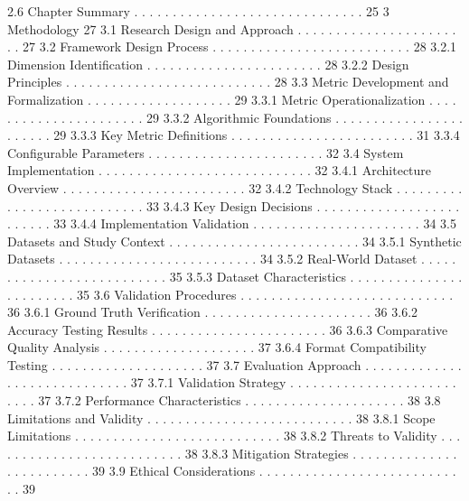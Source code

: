 2.6 Chapter Summary . . . . . . . . . . . . . . . . . . . . . . . . . . . . . . 25
3 Methodology 27
3.1 Research Design and Approach . . . . . . . . . . . . . . . . . . . . . . . 27
3.2 Framework Design Process . . . . . . . . . . . . . . . . . . . . . . . . . . 28
3.2.1 Dimension Identification . . . . . . . . . . . . . . . . . . . . . . . 28
3.2.2 Design Principles . . . . . . . . . . . . . . . . . . . . . . . . . . . 28
3.3 Metric Development and Formalization . . . . . . . . . . . . . . . . . . . 29
3.3.1 Metric Operationalization . . . . . . . . . . . . . . . . . . . . . . 29
3.3.2 Algorithmic Foundations . . . . . . . . . . . . . . . . . . . . . . . 29
3.3.3 Key Metric Definitions . . . . . . . . . . . . . . . . . . . . . . . . 31
3.3.4 Configurable Parameters . . . . . . . . . . . . . . . . . . . . . . . 32
3.4 System Implementation . . . . . . . . . . . . . . . . . . . . . . . . . . . . 32
3.4.1 Architecture Overview . . . . . . . . . . . . . . . . . . . . . . . . 32
3.4.2 Technology Stack . . . . . . . . . . . . . . . . . . . . . . . . . . . 33
3.4.3 Key Design Decisions . . . . . . . . . . . . . . . . . . . . . . . . . 33
3.4.4 Implementation Validation . . . . . . . . . . . . . . . . . . . . . . 34
3.5 Datasets and Study Context . . . . . . . . . . . . . . . . . . . . . . . . . 34
3.5.1 Synthetic Datasets . . . . . . . . . . . . . . . . . . . . . . . . . . 34
3.5.2 Real-World Dataset . . . . . . . . . . . . . . . . . . . . . . . . . . 35
3.5.3 Dataset Characteristics . . . . . . . . . . . . . . . . . . . . . . . . 35
3.6 Validation Procedures . . . . . . . . . . . . . . . . . . . . . . . . . . . . 36
3.6.1 Ground Truth Verification . . . . . . . . . . . . . . . . . . . . . . 36
3.6.2 Accuracy Testing Results . . . . . . . . . . . . . . . . . . . . . . . 36
3.6.3 Comparative Quality Analysis . . . . . . . . . . . . . . . . . . . . 37
3.6.4 Format Compatibility Testing . . . . . . . . . . . . . . . . . . . . 37
3.7 Evaluation Approach . . . . . . . . . . . . . . . . . . . . . . . . . . . . . 37
3.7.1 Validation Strategy . . . . . . . . . . . . . . . . . . . . . . . . . . 37
3.7.2 Performance Characteristics . . . . . . . . . . . . . . . . . . . . . 38
3.8 Limitations and Validity . . . . . . . . . . . . . . . . . . . . . . . . . . . 38
3.8.1 Scope Limitations . . . . . . . . . . . . . . . . . . . . . . . . . . . 38
3.8.2 Threats to Validity . . . . . . . . . . . . . . . . . . . . . . . . . . 38
3.8.3 Mitigation Strategies . . . . . . . . . . . . . . . . . . . . . . . . . 39
3.9 Ethical Considerations . . . . . . . . . . . . . . . . . . . . . . . . . . . . 39
